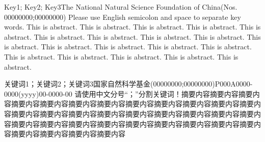 
\begin{oneCol}
    \begin{enabstract}{Key1; Key2; Key3}{The National Natural Science Foundation of China(Nos. 00000000;00000000)}
        Please use English semicolon and space to separate key words. This is abstract. This is abstract. This is abstract. This is abstract. This is abstract. This is abstract. This is abstract. This is abstract. This is abstract. This is abstract. This is abstract. This is abstract. This is abstract. This is abstract. This is abstract. This is abstract. This is abstract. This is abstract. This is abstract.
    \end{enabstract}

    \begin{cnabstract}{关键词1；关键词2；关键词3}{国家自然科学基金(00000000;00000000)}{P000}{A}{0000-0000(yyyy)00-0000-00}
        请使用中文分号“；”分割关键词！摘要内容摘要内容摘要内容摘要内容摘要内容摘要内容摘要内容摘要内容摘要内容摘要内容摘要内容摘要内容摘要内容摘要内容摘要内容摘要内容摘要内容摘要内容摘要内容摘要内容摘要内容摘要内容摘要内容摘要内容摘要内容摘要内容摘要内容摘要内容摘要内容摘要内容摘要内容摘要内容摘要内容摘要内容
    \end{cnabstract}
\end{oneCol}

